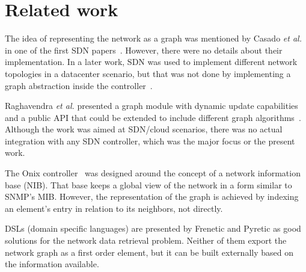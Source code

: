 \section{Related work}
\label{sec:related-work}


The idea of representing the network as a graph was mentioned by Casado
\emph{et al.} in one of the first SDN papers~\cite{martin2010virtualizing}. 
However, there were no details about their implementation. In a later work,
SDN was used to implement different network topologies in a datacenter
scenario, but that was not done by implementing a graph abstraction inside
the controller~\cite{ripcord}.

Raghavendra \emph{et al.} presented a graph module with dynamic update
capabilities and a public API that could be extended to include different
graph algorithms~\cite{ramya2012dynamic}.
Although the work was aimed at SDN/cloud scenarios, there was
no actual integration with any SDN controller, which was the major
focus or the present work.

The Onix controller~\citep{teemu2010onix} was designed around the
concept of a network information base (NIB). That base keeps a global
view of the network in a form similar to SNMP's MIB. However, the
representation of the graph is achieved by indexing an element's entry in
relation to its neighbors, not directly.

DSLs (domain specific languages) are presented by 
Frenetic \citep{Foster:2011:FNP:2034574.2034812} and 
Pyretic \citep{Monsanto:2013:CSN:2482626.2482629} as good
solutions for the network data retrieval problem. Neither of them
export the network graph as a first order element, but it can be built
externally based on the information available.


